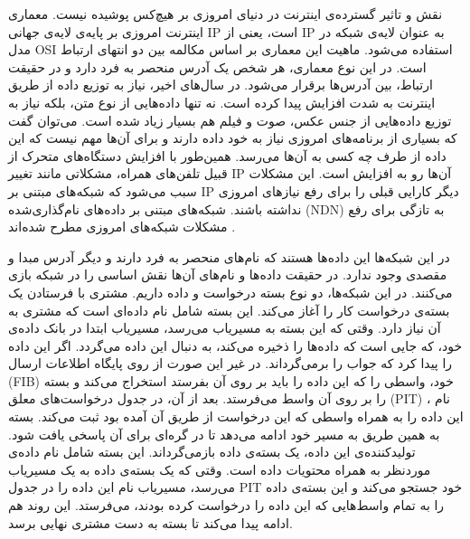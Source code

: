 

نقش و تاثیر گسترده‌ی اینترنت در دنیای امروزی بر هیچ‌کس پوشیده نیست. معماری اینترنت امروزی بر پایه‌ی لایه‌ی جهانی IP است، یعنی از IP به عنوان لایه‌ی شبکه در مدل OSI  استفاده می‌شود. ماهیت این معماری بر اساس مکالمه بین دو انتهای ارتباط است. در این نوع معماری، هر شخص یک آدرس منحصر به فرد دارد و در حقیقت ارتباط، بین آدرس‌ها برقرار می‌شود. 
در سال‌های اخیر، نیاز به توزیع داده‌ از طریق اینترنت به شدت افزایش پیدا کرده است. نه تنها داده‌هایی از نوع متن، بلکه نیاز به توزیع داده‌هایی از جنس عکس، صوت و فیلم هم بسیار زیاد شده است. می‌توان گفت که بسیاری از برنامه‌های امروزی نیاز به خود داده دارند و برای آن‌ها مهم نیست که این داده از طرف چه کسی به آن‌ها می‌رسد. همین‌طور با افزایش دستگاه‌های متحرک از قبیل تلفن‌های همراه، مشکلاتی مانند تغییر IP آن‌ها رو به افزایش است. این مشکلات سبب می‌شود که شبکه‌‌های مبتنی بر IP دیگر کارایی قبلی را برای رفع نیازهای امروزی نداشته باشند. شبکه‌های مبتنی بر داده‌‌های نام‌گذاری‌شده
(NDN)
 به تازگی برای رفع مشکلات شبکه‌های امروزی مطرح شده‌اند
\cite{ndn}.

در این شبکه‌ها این داده‌ها هستند که نام‌های منحصر به فرد دارند و دیگر آدرس مبدا و مقصدی وجود ندارد. در حقیقت داده‌ها و نام‌‌های آن‌ها نقش اساسی را در شبکه بازی می‌کنند. در این شبکه‌ها، دو نوع بسته درخواست و داده داریم. مشتری با فرستادن یک بسته‌ی درخواست کار را آغاز می‌کند. این بسته شامل نام داده‌ای است که مشتری به آن نیاز دارد. وقتی که این بسته به مسیریاب می‌رسد، مسیریاب ابتدا در بانک داده‌ی خود، که جایی است که داده‌ها را ذخیره می‌کند، به دنبال این داده می‌گردد. اگر این داده را پیدا کرد که جواب را برمی‌گرداند. در غیر این صورت از روی پایگاه اطلاعات ارسال (FIB) خود، واسطی را که این داده را باید بر روی آن بفرستد استخراج می‌کند و بسته را بر روی آن واسط می‌فرستد. بعد از آن، در جدول درخواست‌های معلق (PIT) ، نام این داده را به همراه واسطی که این درخواست از طریق آن آمده بود ثبت می‌کند. بسته به همین‌ طریق به مسیر خود ادامه می‌دهد تا در گره‌ای برای آن پاسخی یافت شود. تولیدکننده‌ی این داده، یک بسته‌ی داده بازمی‌گرداند. این بسته شامل نام داده‌‌ی موردنظر به همراه محتویات داده است. وقتی که یک بسته‌ی داده به یک مسیریاب می‌رسد، مسیریاب نام این داده را در جدول PIT خود جستجو می‌کند و این بسته‌ی داده را به تمام واسط‌هایی که این داده را درخواست کرده بودند، می‌فرستد. این روند هم ادامه پیدا می‌کند تا بسته به دست مشتری نهایی برسد. 
 
